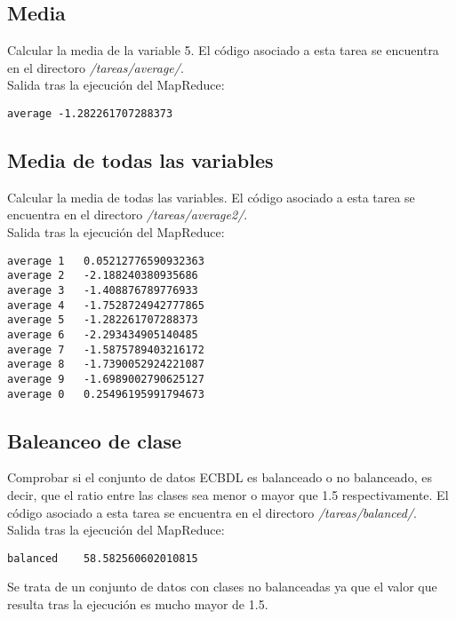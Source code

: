 \subsection{Media}

Calcular la media de la variable 5. El código asociado a esta tarea se encuentra en el directoro \textit{/tareas/average/}. \\

Salida tras la ejecución del MapReduce:

\begin{lstlisting}
average	-1.282261707288373
\end{lstlisting}


\subsection{Media de todas las variables}

Calcular la media de todas las variables. El código asociado a esta tarea se encuentra en el directoro \textit{/tareas/average2/}. \\

Salida tras la ejecución del MapReduce:

\begin{lstlisting}
average 1	0.05212776590932363
average 2	-2.188240380935686
average 3	-1.408876789776933
average 4	-1.7528724942777865
average 5	-1.282261707288373
average 6	-2.293434905140485
average 7	-1.5875789403216172
average 8	-1.7390052924221087
average 9	-1.6989002790625127
average 0	0.25496195991794673
\end{lstlisting}


\subsection{Baleanceo de clase}

Comprobar si el conjunto de datos ECBDL es balanceado o no balanceado, es decir, que el ratio entre las clases sea menor o mayor que 1.5 respectivamente. El código asociado a esta tarea se encuentra en el directoro \textit{/tareas/balanced/}. \\

Salida tras la ejecución del MapReduce:

\begin{lstlisting}
balanced	58.582560602010815
\end{lstlisting}

Se trata de un conjunto de datos con clases no balanceadas ya que el valor que resulta tras la ejecución es mucho mayor de 1.5. \\



